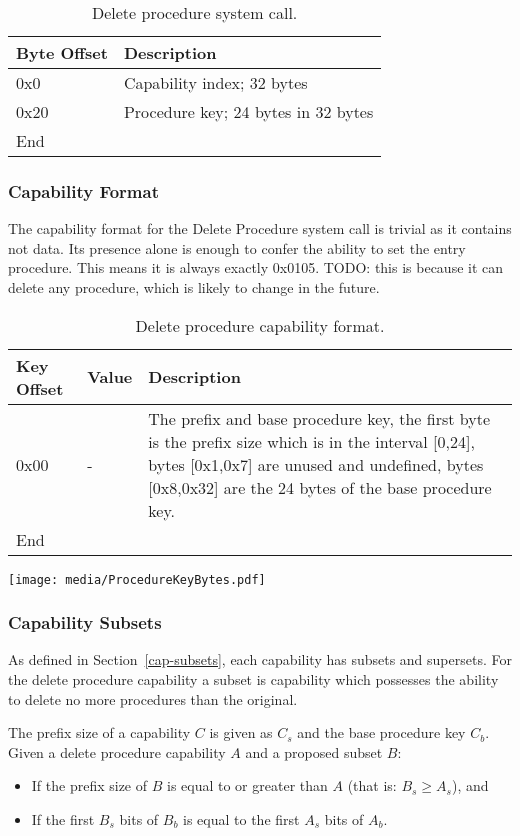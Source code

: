 \documentclass[english,a4paper]{article}
\let\oldparagraph\subsubsection
\renewcommand{\subsubsection}[1]{\oldparagraph{#1}\mbox{}}
\begin{document}
\begin{table}[H]
  \caption{Delete procedure system call.}
  \centering{}%
  \begin{tabular}{l|p{}}
    \hline
    Byte Offset & Description\tabularnewline
    \hline
    \hline
    0x0 & Capability index; 32 bytes \tabularnewline
    0x20 & Procedure key; 24 bytes in 32 bytes \tabularnewline
    \hline
    End &  \tabularnewline
    \hline
  \end{tabular}
\end{table}

\subsubsection{Capability Format}
The capability format for the Delete Procedure system call is trivial as it
contains not data. Its presence alone is enough to confer the ability to set the
entry procedure. This means it is always exactly 0x0105. TODO: this is because
it can delete any procedure, which is likely to change in the future.

\begin{table}[H]
  \caption{Delete procedure capability format.}
  \centering{}%
  \begin{tabular}{l|l|p{}}
    \hline
    Key Offset & Value & Description\tabularnewline
    \hline
    \hline
    0x00 & -    & The prefix and base procedure key, the first byte is the prefix
                 size which is in the interval [0,24], bytes [0x1,0x7] are
                 unused and undefined, bytes [0x8,0x32] are the 24 bytes of the
                 base procedure key. \tabularnewline
    \hline
    End &  \tabularnewline
    \hline
  \end{tabular}
\end{table}

\texttt{[image: media/ProcedureKeyBytes.pdf]}

\subsubsection{Capability Subsets}
As defined in Section~\ref{cap-subsets}, each capability has subsets and
supersets. For the delete procedure capability a subset is capability which
possesses the ability to delete no more procedures than the original.

The prefix size of a capability $C$ is given as $C_s$ and the base procedure key
$C_b$. Given a delete procedure capability $A$ and a proposed subset $B$:
\begin{itemize}
  \item If the prefix size of $B$ is equal to or greater than $A$ (that is: $B_s
  \geq A_s$), and
  \item If the first $B_s$ bits of $B_b$ is equal to the first $A_s$ bits of
  $A_b$.
\end{itemize}
\end{document}
